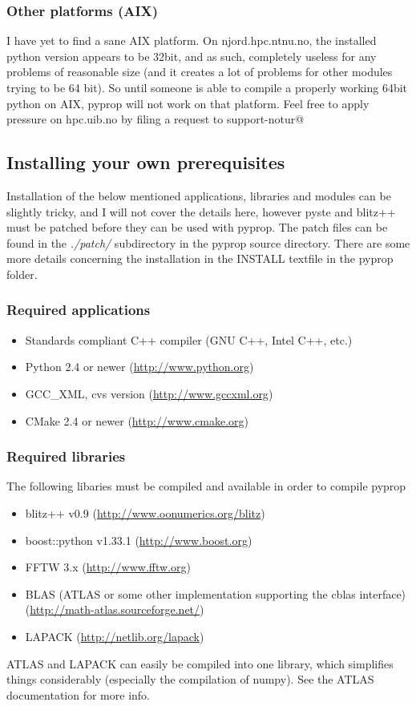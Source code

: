 \subsubsection*{Other platforms (AIX)}
I have yet to find a sane AIX platform. On njord.hpc.ntnu.no, the installed python version appears to be 32bit, 
and as such, completely useless for any problems of reasonable size (and it creates a lot of problems for other modules
trying to be 64 bit). So until someone is able to compile a properly working 64bit python on AIX, pyprop will not work
on that platform. Feel free to apply pressure on hpc.uib.no by filing a request to support-notur@
	
\subsection{Installing your own prerequisites}
Installation of the below mentioned applications, libraries and modules can be slightly tricky, and I 
will not cover the details here, however pyste and blitz++ must be patched before they can be used 
with pyprop. The patch files can be found in the \textit{./patch/} subdirectory in the pyprop 
source directory. There are some more details concerning the installation in the INSTALL textfile
in the pyprop folder.

\subsubsection*{Required applications}
\begin{itemize}
\item Standards compliant C++ compiler (GNU C++, Intel C++, etc.)
\item Python 2.4 or newer (\url{http://www.python.org})
\item GCC\_XML, cvs version (\url{http://www.gccxml.org})
\item CMake 2.4 or newer (\url{http://www.cmake.org})
\end{itemize}
	
\subsubsection*{Required libraries}
The following libaries must be compiled and available in order to compile pyprop
\begin{itemize}
\item blitz++ v0.9 (\url{http://www.oonumerics.org/blitz})
\item boost::python v1.33.1 (\url{http://www.boost.org})
\item FFTW 3.x (\url{http://www.fftw.org})
\item BLAS (ATLAS or some other implementation supporting the cblas interface) (\url{http://math-atlas.sourceforge.net/})
\item LAPACK (\url{http://netlib.org/lapack})
\end{itemize}
ATLAS and LAPACK can easily be compiled into one library, which simplifies things considerably (especially the compilation
of numpy). See the ATLAS documentation for more info.

